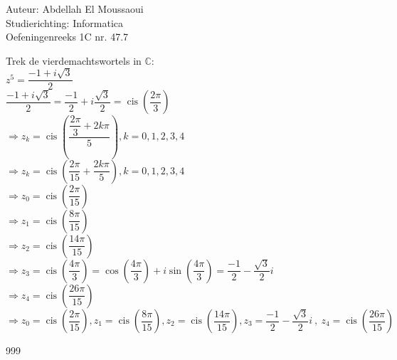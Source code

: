 \documentclass[a4paper]{article}
\begin{document}
  
\noindent \large Auteur: Abdellah El Moussaoui\\
\noindent \large Studierichting: Informatica\\
\noindent \large Oefeningenreeks 1C nr. 47.7\\

\medskip

\normalsize

\medskip

Trek de vierdemachtswortels in $\mathbb{C}$:\\

$z^5=\dfrac{-1+i\sqrt3}{2}$\\

$\dfrac{-1+i\sqrt3}{2}=\dfrac{-1}{2} + i\dfrac{\sqrt{3}}{2}=\operatorname{cis}\left(\dfrac{2\pi}{3}\right)$\\


$\Rightarrow z_k=\operatorname{cis}\left(\dfrac{\dfrac{2\pi}{3}+2k\pi}{5}\right),k=0,1,2,3,4$\\

$\Rightarrow z_k=\operatorname{cis}\left(\dfrac{2\pi}{15}+\dfrac{2k\pi}{5}\right),k=0,1,2,3,4$\\


$\Rightarrow z_0=\operatorname{cis}\left(\dfrac{2\pi}{15}\right)$\\

$\Rightarrow z_1=\operatorname{cis}\left(\dfrac{8\pi}{15}\right)$\\

$\Rightarrow z_2=\operatorname{cis}\left(\dfrac{14\pi}{15}\right)$\\

$\Rightarrow z_3=\operatorname{cis}\left(\dfrac{4\pi}{3}\right)=\cos\left({\dfrac{4\pi}{3}}\right)+i\sin\left({\dfrac{4\pi}{3}}\right)=\dfrac{-1}{2}-\dfrac{\sqrt{3}}{2}i$\\

$\Rightarrow z_4=\operatorname{cis}\left(\dfrac{26\pi}{15}\right)$\\

$\Rightarrow \boxed{z_0=\operatorname{cis}\left(\dfrac{2\pi}{15}\right),z_1=\operatorname{cis}\left(\dfrac{8\pi}{15}\right),z_2=\operatorname{cis}\left(\dfrac{14\pi}{15}\right),z_3=\dfrac{-1}{2}-\dfrac{\sqrt{3}}{2}i \ , \ z_4=\operatorname{cis}\left(\dfrac{26\pi}{15}\right)}$\\

\begin{thebibliography}{999}
\end{thebibliography}
\end{document}
